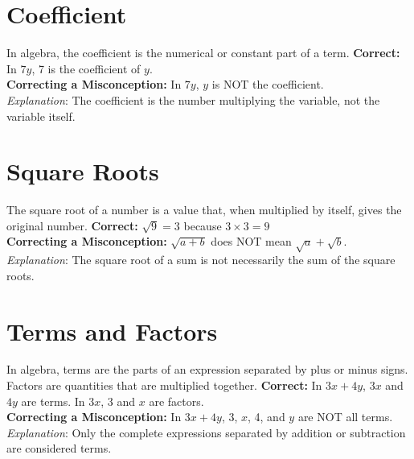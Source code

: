 \documentclass[12pt]{article}
\newenvironment{correct}{\noindent\textbf{Correct:}}{\\}
\newenvironment{misconception}{\noindent\textbf{Correcting a Misconception:}}{\\}
\newenvironment{explanation}{\noindent\textit{Explanation}:}{\\\vspace{1em}}
\begin{document}
\section*{Coefficient}
In algebra, the coefficient is the numerical or constant part of a term.
\begin{correct} In \(7y\), 7 is the coefficient of \(y\). \end{correct}
\begin{misconception} In \(7y\), \(y\) is NOT the coefficient. \end{misconception}
\begin{explanation} The coefficient is the number multiplying the variable, not the variable itself. \end{explanation}

\section*{Square Roots}
The square root of a number is a value that, when multiplied by itself, gives the original number.
\begin{correct} \(\sqrt{9} = 3\) because \(3 \times 3 = 9\) \end{correct}
\begin{misconception} \(\sqrt{a + b}\) does NOT mean \(\sqrt{a} + \sqrt{b}\). \end{misconception}
\begin{explanation} The square root of a sum is not necessarily the sum of the square roots. \end{explanation}

\section*{Terms and Factors}
In algebra, terms are the parts of an expression separated by plus or minus signs. Factors are quantities that are multiplied together.
\begin{correct} In \(3x + 4y\), \(3x\) and \(4y\) are terms. In \(3x\), 3 and \(x\) are factors. \end{correct}
\begin{misconception} In \(3x + 4y\), 3, \(x\), 4, and \(y\) are NOT all terms. \end{misconception}
\begin{explanation} Only the complete expressions separated by addition or subtraction are considered terms. \end{explanation}
\end{document}

